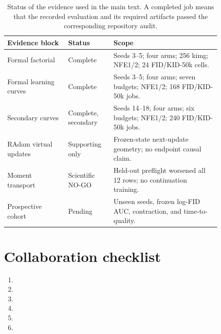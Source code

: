 \documentclass{article}
\newif\ifshowcomments
\newcommand{\todo}[1]{%
  \ifshowcomments{\color{todored}\textbf{[TODO: #1]}}\fi}
\begin{document}
\begin{table}[h]
  \caption{Status of the evidence used in the main text. A completed job means
  that the recorded evaluation and its required artifacts passed the
  corresponding repository audit.}
  \label{tab:evidence-status}
  \centering
  \small
  \begin{tabular}{p{0.25\linewidth}p{0.18\linewidth}p{0.44\linewidth}}
    \toprule
    Evidence block & Status & Scope \\
    \midrule
    Formal factorial & Complete &
    Seeds 3--5; four arms; 256 kimg; NFE1/2; 24 FID/KID-50k cells. \\
    Formal learning curves & Complete &
    Seeds 3--5; four arms; seven budgets; NFE1/2; 168 FID/KID-50k jobs. \\
    Secondary curves & Complete, secondary &
    Seeds 14--18; four arms; six budgets; NFE1/2; 240 FID/KID-50k jobs. \\
    RAdam virtual updates & Supporting only &
    Frozen-state next-update geometry; no endpoint causal claim. \\
    Moment transport & Scientific NO-GO &
    Held-out preflight worsened all 12 rows; no continuation training. \\
    Prospective cohort & Pending &
    Unseen seeds, frozen log-FID AUC, contraction, and time-to-quality. \\
    \bottomrule
  \end{tabular}
\end{table}

\section{Collaboration checklist}
\label{app:collaboration-checklist}

\begin{enumerate}
  \item \todo{Replace the methods placeholder with values copied from frozen
  manifests and obtain a second-author verification.}
  \item \todo{Build seed-resolved learning-curve and budget-dependent
  factorial-contrast figures; preserve training seed as the unit.}
  \item \todo{Freeze the prospective cohort and primary AUC before launching
  any new training run.}
  \item \todo{Complete the target-component audit without using it as a
  mediation claim.}
  \item \todo{Run the literature and citation audit, including exact overlap
  boundaries for adaptive-optimizer scale effects.}
  \item \todo{Disable comments, resolve every TODO/CHECK/CLAIM marker, compile
  with the official ICLR 2027 style, and confirm the 9-page main-text limit.}
\end{enumerate}
\end{document}
